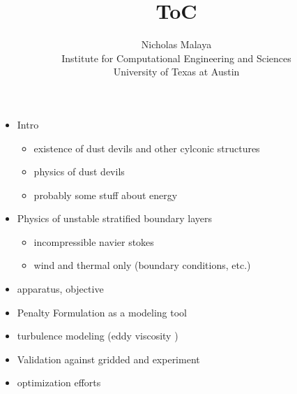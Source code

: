 \documentclass{article}
\title{\bf{ToC}}
\author{Nicholas Malaya \\ Institute for Computational Engineering and Sciences \\ University of Texas at Austin} \date{}
\begin{document}
\maketitle

\newpage

\begin{itemize}
  \item Intro
\begin{itemize}
	\item existence of dust devils and other cylconic structures
        \item physics of dust devils
	\item probably some stuff about energy
\end{itemize}

  \item Physics of unstable stratified boundary layers
\begin{itemize}
	\item incompressible navier stokes
        \item wind and thermal only (boundary conditions, etc.)
\end{itemize}
  \item apparatus, objective
  \item Penalty Formulation as a modeling tool
  \item turbulence modeling (eddy viscosity )
  \item Validation against gridded and experiment
  \item optimization efforts
\end{itemize}
\end{document}
